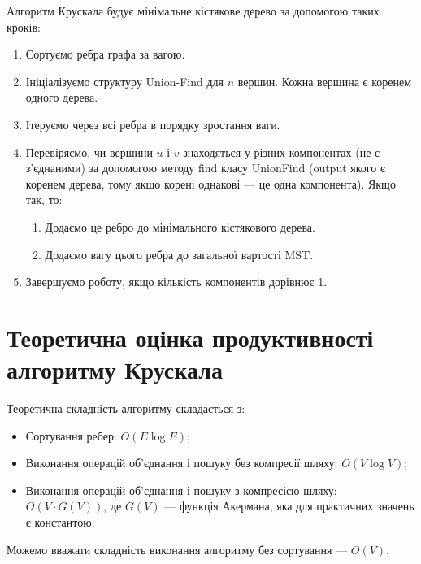 \documentclass{article}
\begin{document}
Алгоритм Крускала будує мінімальне кістякове дерево за допомогою таких кроків:
\begin{enumerate}
    \item Сортуємо ребра графа за вагою.
    \item Ініціалізуємо структуру Union-Find для $n$ вершин. Кожна вершина є коренем одного дерева.
    \item Ітеруємо через всі ребра в порядку зростання ваги.
    \item Перевіряємо, чи вершини $u$ і $v$ знаходяться у різних компонентах (не є з'єднаними) за допомогою методу find класу UnionFind 
    (output якого є коренем дерева, тому якщо корені однакові — це одна компонента). Якщо так, то:
    \begin{enumerate}
        \item Додаємо це ребро до мінімального кістякового дерева.
        \item Додаємо вагу цього ребра до загальної вартості MST.
    \end{enumerate}
    \item Завершуємо роботу, якщо кількість компонентів дорівнює 1.
\end{enumerate}

\section{Теоретична оцінка продуктивності алгоритму Крускала}
Теоретична складність алгоритму складається з:
\begin{itemize}
    \item Сортування ребер: $O(E \log E)$;
    \item Виконання операцій об'єднання і пошуку без компресії шляху: $O(V \log V)$;
    \item Виконання операцій об'єднання і пошуку з компресією шляху: $O(V \cdot G(V))$, де $G(V)$ — функція Акермана, яка для практичних значень є константою.
\end{itemize}

Можемо вважати складність виконання алгоритму без сортування — $O(V)$.
\end{document}
